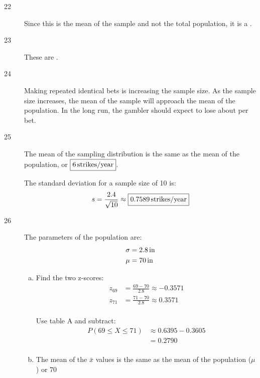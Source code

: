 \documentclass[letterpaper, landscape]{exam}
\newcommand{\cent}{\textcent\xspace}
\begin{document}
    \begin{description}

      \item[22] Since this is the mean of the sample and not the total
        population, it is a .

      \item[23] These are .

      \item[24] Making repeated identical bets is increasing the sample size.
        As the sample size increases, the mean of the sample will approach the
        mean of the population. In the long run, the gambler should expect to
        lose about \fbox{ 5.3\cent{} } per bet.

      \item[25] The mean of the sampling distribution is the same as the mean of
        the population, or $\boxed{ \unit[6]{strikes/year} }$.

        The standard deviation for a sample size of 10 is:
        \[
          s = \frac{2.4}{\sqrt{10}} \approx \boxed{ \unit[0.7589]{strikes/year} }
        \]

      \item[26]
        The parameters of the population are:
        \begin{align*}
          \sigma & = \unit[2.8]{in} \\
          \mu    & = \unit[70]{in} \\
        \end{align*}

        \begin{enumerate}[(a)]
          \item Find the two z-scores:
            \begin{align*}
              z_{69} &= \frac{69 - 70}{2.8} \approx -0.3571 \\
              z_{71} &= \frac{71 - 70}{2.8} \approx 0.3571 \\
            \end{align*}

            Use table A and subtract:
            \begin{align*}
              P(69 \leq X \leq 71) & \approx 0.6395 - 0.3605 \\
                                   & = \boxed{ 0.2790 } \\
            \end{align*}

          \item 
            The mean of the $\bar{x}$ values is the same as the mean of the
            population ($\mu$) or $\boxed{ 70 }$


\end{enumerate}
\end{description}
\end{document}
